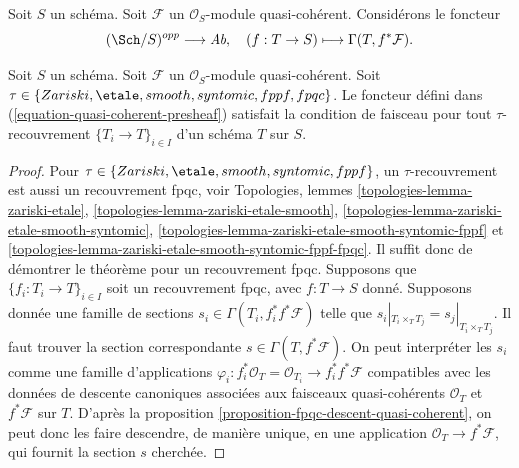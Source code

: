 \medskip\noindent
Soit $S$ un schéma.
Soit $\mathcal{F}$ un $\mathcal{O}_S$-module quasi-cohérent.
Considérons le foncteur
\begin{equation}
\label{equation-quasi-coherent-presheaf}
(\Sch/S)^{opp} \longrightarrow \textit{Ab},
\quad
(f : T \to S) \longmapsto \Gamma(T, f^*\mathcal{F}).
\end{equation}

\begin{lemma}
\label{lemma-sheaf-condition-holds}
Soit $S$ un schéma.
Soit $\mathcal{F}$ un $\mathcal{O}_S$-module quasi-cohérent.
Soit $\tau \in \{Zariski, \linebreak[0] \etale, \linebreak[0] smooth,
\linebreak[0] syntomic, \linebreak[0] fppf, \linebreak[0] fpqc\}$.
Le foncteur défini dans (\ref{equation-quasi-coherent-presheaf})
satisfait la condition de faisceau pour tout $\tau$-recouvrement
$\{T_i \to T\}_{i \in I}$ d'un schéma $T$ sur $S$.
\end{lemma}

\begin{proof}
Pour $\tau \in \{Zariski, \linebreak[0] \etale, \linebreak[0] smooth,
\linebreak[0] syntomic, \linebreak[0] fppf\}$, un $\tau$-recouvrement
est aussi un recouvrement fpqc, voir
Topologies, lemmes
\ref{topologies-lemma-zariski-etale},
\ref{topologies-lemma-zariski-etale-smooth},
\ref{topologies-lemma-zariski-etale-smooth-syntomic},
\ref{topologies-lemma-zariski-etale-smooth-syntomic-fppf} et
\ref{topologies-lemma-zariski-etale-smooth-syntomic-fppf-fpqc}.
Il suffit donc de démontrer le théorème
pour un recouvrement fpqc. Supposons que $\{f_i : T_i \to T\}_{i \in I}$
soit un recouvrement fpqc, avec $f : T \to S$ donné. Supposons
donnée une famille de sections $s_i \in \Gamma(T_i , f_i^*f^*\mathcal{F})$
telle que $s_i|_{T_i \times_T T_j} = s_j|_{T_i \times_T T_j}$.
Il faut trouver la section correspondante $s \in \Gamma(T, f^*\mathcal{F})$.
On peut interpréter les $s_i$ comme une famille d'applications
$\varphi_i : f_i^*\mathcal{O}_T = \mathcal{O}_{T_i} \to f_i^*f^*\mathcal{F}$
compatibles avec les données de descente canoniques associées aux
faisceaux quasi-cohérents $\mathcal{O}_T$ et $f^*\mathcal{F}$ sur $T$.
D'après la proposition \ref{proposition-fpqc-descent-quasi-coherent},
on peut donc les faire descendre, de manière unique,
en une application $\mathcal{O}_T \to f^*\mathcal{F}$, qui fournit
la section $s$ cherchée.
\end{proof}

